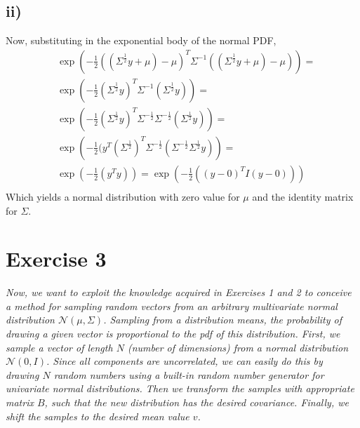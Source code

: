 \documentclass[11pt]{scrartcl} %
\begin{document}
         \subsection*{ii)}
         Now, substituting in the exponential body of the normal PDF,
         \begin{equation}
           \begin{split}
             &\exp\left(-\frac{1}{2}((\Sigma^{\frac{1}{2}}y+\mu)-\mu)^T{\Sigma}^{-1}((\Sigma^{\frac{1}{2}}y+\mu)-\mu)\right) =\\
             &\exp\left(-\frac{1}{2}(\Sigma^{\frac{1}{2}}y)^T{\Sigma}^{-1}(\Sigma^{\frac{1}{2}}y)\right) =\\
             &\exp\left(-\frac{1}{2}(\Sigma^{\frac{1}{2}}y)^T{\Sigma}^{-\frac{1}{2}}{\Sigma}^{-\frac{1}{2}}(\Sigma^{\frac{1}{2}}y)\right)=\\
             &\exp\left(-\frac{1}{2}(y^T(\Sigma^{\frac{1}{2}})^T{\Sigma}^{-\frac{1}{2}}({\Sigma}^{-\frac{1}{2}}\Sigma^{\frac{1}{2}}y)\right)=\\
             &\exp\left(-\frac{1}{2}(y^Ty)\right)=\exp\left(-\frac{1}{2}((y-0)^TI(y-0))\right)\\
           \end{split}
         \end{equation}
         Which yields a normal distribution with zero value for \(\mu\) and the identity matrix for \(\Sigma\).\\


         \vspace{5mm}
\section*{Exercise 3}
         {\it Now, we want to exploit the knowledge acquired in Exercises 1 and 2 to conceive a method for sampling random vectors from an arbitrary multivariate normal distribution \(\mathcal{N}(\mu, \Sigma)\). Sampling from a distribution means, the probability of drawing a given vector is proportional to the pdf of this distribution. First, we sample a vector of length \(N\) (number of dimensions) from a normal distribution \(\mathcal{N}(0, I)\). Since all components are uncorrelated, we can easily do this by drawing \(N\) random numbers using a built-in random number generator for univariate normal distributions. Then we transform the samples with appropriate matrix \(B\), such that the new distribution has the desired covariance. Finally, we shift the samples to the desired mean value \(v\).}        
\end{document}
